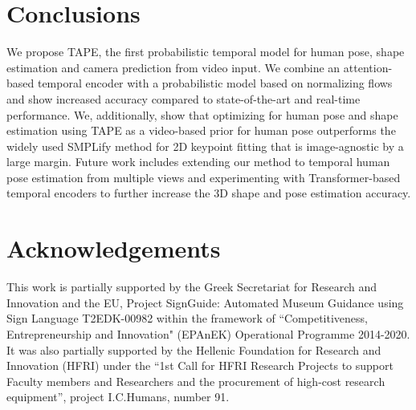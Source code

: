 \documentclass[runningheads]{llncs}
\begin{document}
\section{Conclusions}
We propose TAPE, the first probabilistic temporal model for human pose, shape estimation and camera prediction from video input. We combine an attention-based temporal encoder with a probabilistic model based on normalizing flows and show increased accuracy compared to state-of-the-art and real-time performance. We, additionally, show that optimizing for human pose and shape estimation using TAPE as a video-based prior for human pose outperforms the widely used SMPLify method for 2D keypoint fitting that is image-agnostic by a large margin. Future work includes extending our method to temporal human pose estimation from multiple views and experimenting with Transformer-based temporal encoders to further increase the 3D shape and pose estimation accuracy.

\section*{Acknowledgements}
This work is partially supported by the Greek Secretariat for Research and Innovation and the EU, Project SignGuide: Automated Museum Guidance using Sign Language T2EDK-00982 within the
framework of ``Competitiveness, Entrepreneurship and Innovation" (EPAnEK) Operational Programme 2014-2020. It was also partially supported by the Hellenic Foundation for Research and Innovation (HFRI)  under the ``1st Call for HFRI Research Projects to support Faculty members and Researchers and the procurement of high-cost research equipment'', project I.C.Humans, number 91.








\end{document}

